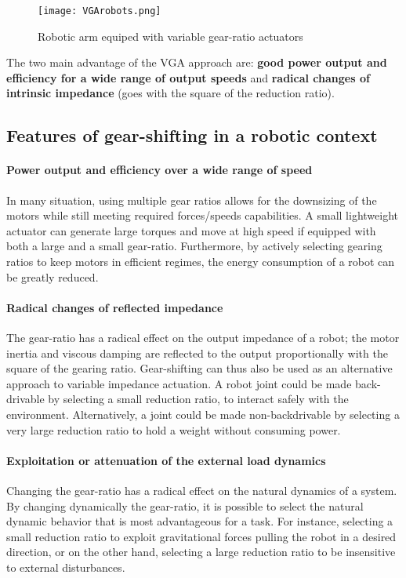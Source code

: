 \begin{figure}[htb]
        \centering
				\texttt{[image: VGArobots.png]}
        \caption{Robotic arm equiped with variable gear-ratio actuators}\label{fig:vgarobots}
\end{figure}


The two main advantage of the VGA approach are: \textbf{good power output and efficiency for a wide range of output speeds} and \textbf{radical changes of intrinsic impedance} (goes with the square of the reduction ratio). 



\subsection{Features of gear-shifting in a robotic context}

\paragraph{Power output and efficiency over a wide range of speed}
In many situation, using multiple gear ratios allows for the downsizing of the motors while still meeting required forces/speeds capabilities. A small lightweight actuator can generate large torques and move at high speed if equipped with both a large and a small gear-ratio. Furthermore, by actively selecting gearing ratios to keep motors in efficient regimes, the energy consumption of a robot can be greatly reduced. 

\paragraph{Radical changes of reflected impedance}
The gear-ratio has a radical effect on the output impedance of a robot; the motor inertia and viscous damping are reflected to the output proportionally with the square of the gearing ratio. Gear-shifting can thus also be used as an alternative approach to variable impedance actuation. A robot joint could be made back-drivable by selecting a small reduction ratio, to interact safely with the environment.  Alternatively, a joint could be made non-backdrivable by selecting a very large reduction ratio to hold a weight without consuming power.

\paragraph{Exploitation or attenuation of the external load dynamics}
Changing the gear-ratio has a radical effect on the natural dynamics of a system. By changing dynamically the gear-ratio, it is possible to select the natural dynamic behavior that is most advantageous for a task. For instance, selecting a small reduction ratio to exploit gravitational forces pulling the robot in a desired direction, or on the other hand, selecting a large reduction ratio to be insensitive to external disturbances.


